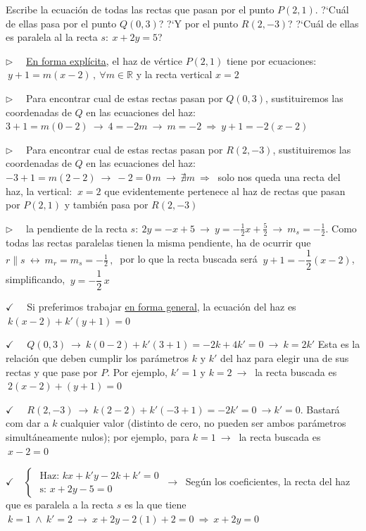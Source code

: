 \begin{miejemplo}

Escribe la ecuación de todas las rectas que pasan por el punto $P(2,1)$. ?`Cuál de ellas pasa por el punto $Q(0,3)$?	 ?`Y por el punto $R(2,-3)$? ?`Cuál de ellas es paralela al la recta $s:\ x+2y=5$?

\vspace{6mm} $\triangleright \quad $ \underline{En forma explícita}, el haz de vértice $P(2,1)$ tiene por ecuaciones: $\ y+1=m(x-2)\, , \ \forall m\in \mathbb R$ y la recta vertical $x=2$

\vspace{4mm} $\triangleright \quad $ Para encontrar cual de estas rectas pasan por $Q(0,3)$, sustituiremos las coordenadas de $Q$ en las ecuaciones del haz:
$3+1=m(0-2) \ \to \ 4=-2m \ \to \ m=-2 \ \Rightarrow \ y+1=-2(x-2)$

\vspace{4mm} $\triangleright \quad $  Para encontrar cual de estas rectas pasan por $R(2,-3)$, sustituiremos las coordenadas de $Q$ en las ecuaciones del haz:
$-3+1=m(2-2) \ \to \ -2=0\, m \ \to \ \nexists m \ \Rightarrow \ $ solo nos queda una recta del haz, la vertical: $\ x=2$ que evidentemente pertenece al haz de rectas que pasan por $P(2,1)$ y también pasa por $R(2,-3)$

\vspace{4mm} $\triangleright \quad $ la pendiente de la recta $s:\ 2y=-x+5 \ \to \ y=-\frac 1 2 x + \frac 5 2 \ \to \ m_s=-\frac 12$. Como todas las rectas paralelas tienen la misma pendiente, ha de ocurrir que $r \parallel s \ \leftrightarrow \ m_r=m_s=-\frac 1 2\, , \ $ por lo que la recta buscada será $\ y+1=-\dfrac 1 2 (x-2)$, simplificando, $\ y=-\dfrac 1 2 \, x$

\vspace{8mm} $\checkmark \quad $ Si preferimos trabajar  \underline{en forma general}, la ecuación del haz es $\ k(x-2)+k'(y+1)=0$

\vspace{2mm} $\checkmark \quad $ $Q(0,3) \ \to \ k(0-2)+k'(3+1)=-2k+4k'=0 \ \to \ k=2k'$ Esta es la relación que deben cumplir los parámetros $k\text{ y } k'$ del haz para elegir una de sus rectas y que pase por $P$. Por ejemplo, $k'=1 \text{ y } k=2 \ \to \ $ la recta buscada es $\ 2(x-2)+(y+1)=0$

\vspace{2mm} $\checkmark \quad $ $R(2,-3) \ \to \ k(2-2)+k'(-3+1)=-2k'=0 \ \to k'=0$. Bastará com dar a $k$ cualquier valor (distinto de cero, no pueden ser ambos parámetros simultáneamente nulos); por ejemplo, para $k=1 \ \to \ $ la recta buscada es $\ x-2=0$

\vspace{2mm} $\checkmark \quad \begin{cases} \text{ Haz: } kx+k'y-2k+k'=0 \\  \text{ s: } x+2y-5=0 \end{cases} \ \to \  $ Según los coeficientes, la recta del haz que es paralela a la recta $s$ es la que tiene $\ k=1 \ \wedge \ k'=2 \ \to \ x+2y-2(1)+2=0 \ \Rightarrow \ x+2y=0$ 
\end{miejemplo}

